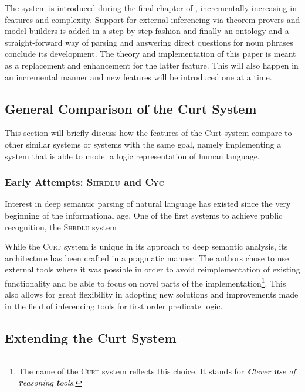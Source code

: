 \documentclass[a4paper,fontsize=12pt]{article}
\newcommand{\pn}{\textsc} %
\theoremstyle{remark} \newtheorem*{termin}{Definition} %
\begin{document}
The system is introduced during the final chapter of \cite{blackburnbos:cl1},
incrementally increasing in features and complexity. Support for external
inferencing via theorem provers and model builders is added in a step-by-step
fashion and finally an ontology and a straight-forward way of parsing and
answering direct questions for noun phrases conclude its development. The theory
and implementation of this paper is meant as a replacement and enhancement for
the latter feature. This will also happen in an incremental manner and new
features will be introduced one at a time.

\subsection{General Comparison of the Curt System}\label{sec:comparision}

This section will briefly discuss how the features of the Curt system compare to
other similar systems or systems with the same goal, namely implementing a
system that is able to model a logic representation of human language.

\subsubsection{Early Attempts: \pn{Shrdlu} and \pn{Cyc}}

Interest in deep semantic parsing of natural language has existed since the very
beginning of the informational age. One of the first systems to achieve public
recognition, the \pn{Shrdlu} system 

While the \pn{Curt} system is unique in its approach to deep semantic analysis, its
architecture has been crafted in a pragmatic manner. The authors chose to use
external tools where it was possible in order to avoid reimplementation of
existing functionality and be able to focus on novel parts of the
implementation\footnote{The name of the \pn{Curt} system reflects this choice.
It stands for \emph{\textbf{C}lever \textbf{u}se of \textbf{r}easoning
\textbf{t}ools}.}. This also allows for great flexibility in adopting new
solutions and improvements made in the field of inferencing tools for first
order predicate logic.

\subsection{Extending the Curt System}
\end{document}
